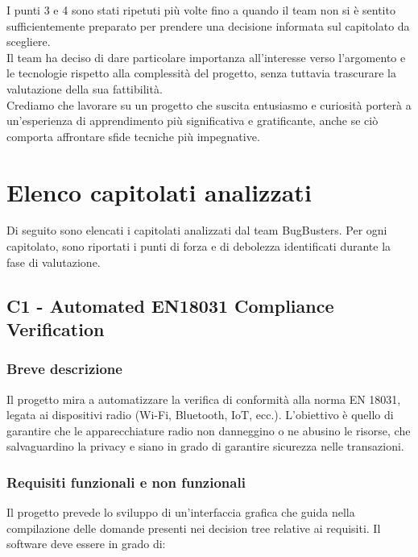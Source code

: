 \documentclass[a4paper,11pt]{article}
\begin{document}
I punti 3 e 4 sono stati ripetuti più volte fino a quando il team non si è sentito sufficientemente preparato per prendere una decisione informata sul capitolato da scegliere.\\
Il team ha deciso di dare particolare importanza all'interesse verso l'argomento e le tecnologie rispetto alla complessità del progetto, senza tuttavia trascurare la valutazione della sua fattibilità.\\
Crediamo che lavorare su un progetto che suscita entusiasmo e curiosità porterà a un'esperienza di apprendimento più significativa e gratificante, anche se ciò comporta affrontare sfide tecniche più impegnative.

\section{Elenco capitolati analizzati}
Di seguito sono elencati i capitolati analizzati dal team BugBusters. Per ogni capitolato, sono riportati i punti di forza e di debolezza identificati durante la fase di valutazione.

\newpage
\subsection{C1 - Automated EN18031 Compliance Verification}
\subsubsection{Breve descrizione}
Il progetto mira a automatizzare la verifica di conformità alla norma EN 18031, legata ai dispositivi radio (Wi-Fi, Bluetooth, IoT, ecc.). L’obiettivo è quello di garantire che le apparecchiature radio non danneggino o ne abusino le risorse, che salvaguardino la privacy e siano in grado di garantire sicurezza nelle transazioni.
\subsubsection{Requisiti funzionali e non funzionali}
Il progetto prevede lo sviluppo di un’interfaccia grafica che guida nella compilazione delle domande presenti nei decision tree relative ai requisiti.  
Il software deve essere in grado di:
\end{document}
